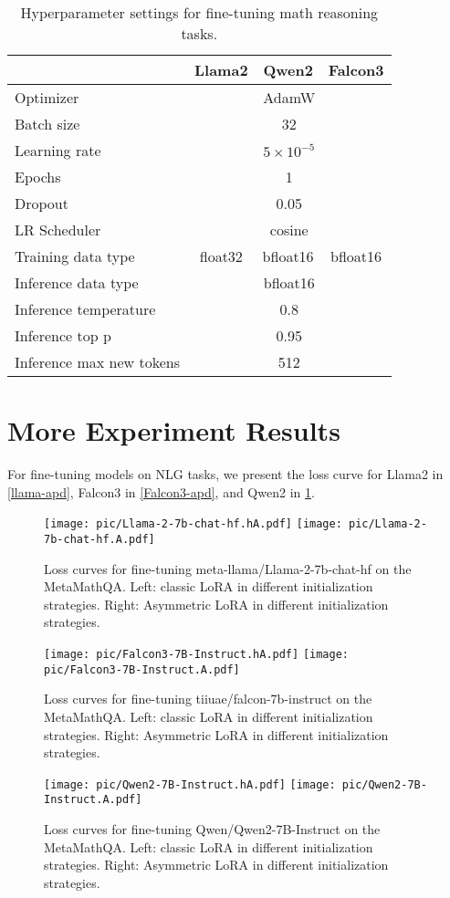 \begin{table*}[htb]
    \label{apd-nlg-tab}
    \centering
    \caption{Hyperparameter settings for fine-tuning math reasoning tasks. }
\begin{tabular}{lccc}
\toprule
 & Llama2 & Qwen2 & Falcon3 \\
\midrule
Optimizer & \multicolumn{3}{c}{AdamW} \\
Batch size & \multicolumn{3}{c}{32} \\
Learning rate & \multicolumn{3}{c}{$5\times 10^{-5}$} \\
Epochs & \multicolumn{3}{c}{1} \\
Dropout & \multicolumn{3}{c}{0.05} \\
LR Scheduler & \multicolumn{3}{c}{cosine} \\
Training data type & float32 & bfloat16 & bfloat16 \\
Inference data type & \multicolumn{3}{c}{bfloat16} \\
Inference temperature & \multicolumn{3}{c}{0.8} \\
Inference top p & \multicolumn{3}{c}{0.95} \\
Inference max new tokens & \multicolumn{3}{c}{512} \\
\bottomrule
\end{tabular}
\end{table*}

\section{More Experiment Results}
\label{nlg-more}
For fine-tuning models on NLG tasks, we present the loss curve for Llama2 in \ref{llama-apd}, Falcon3 in \ref{Falcon3-apd}, and Qwen2 in \ref{qwen2-apd}. 

\begin{figure}
    \centering
    \texttt{[image: pic/Llama-2-7b-chat-hf.hA.pdf]}
    \texttt{[image: pic/Llama-2-7b-chat-hf.A.pdf]}
    \caption{Loss curves for fine-tuning meta-llama/Llama-2-7b-chat-hf on the MetaMathQA. Left: classic LoRA in different initialization strategies. Right: Asymmetric LoRA in different initialization strategies. 
    \label{llama-apd}}
    \texttt{[image: pic/Falcon3-7B-Instruct.hA.pdf]}
    \texttt{[image: pic/Falcon3-7B-Instruct.A.pdf]}
    \caption{Loss curves for fine-tuning tiiuae/falcon-7b-instruct on the MetaMathQA. Left: classic LoRA in different initialization strategies. Right: Asymmetric LoRA in different initialization strategies. 
    \label{Falcon3-apd}}
    \texttt{[image: pic/Qwen2-7B-Instruct.hA.pdf]}
    \texttt{[image: pic/Qwen2-7B-Instruct.A.pdf]}
    \caption{Loss curves for fine-tuning Qwen/Qwen2-7B-Instruct on the MetaMathQA. Left: classic LoRA in different initialization strategies. Right: Asymmetric LoRA in different initialization strategies. 
    \label{qwen2-apd}}
\end{figure}
